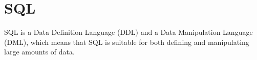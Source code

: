 \chapter{SQL}

SQL is a Data Definition Language (DDL) and a Data Manipulation
Language (DML), which means that SQL is suitable for both defining and
manipulating large amounts of data.
